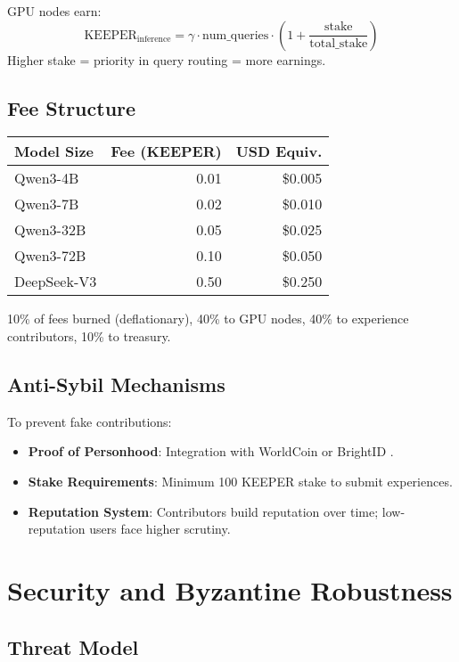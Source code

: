 \documentclass[11pt,a4paper]{article}
\begin{document}
GPU nodes earn:
\[
\text{KEEPER}_{\text{inference}} = \gamma \cdot \text{num\_queries} \cdot \left(1 + \frac{\text{stake}}{\text{total\_stake}}\right)
\]
Higher stake = priority in query routing = more earnings.

\subsection{Fee Structure}

\begin{center}
\begin{tabular}{lrr}
\toprule
\textbf{Model Size} & \textbf{Fee (KEEPER)} & \textbf{USD Equiv.} \\
\midrule
Qwen3-4B & 0.01 & \$0.005 \\
Qwen3-7B & 0.02 & \$0.010 \\
Qwen3-32B & 0.05 & \$0.025 \\
Qwen3-72B & 0.10 & \$0.050 \\
DeepSeek-V3 & 0.50 & \$0.250 \\
\bottomrule
\end{tabular}
\end{center}

10\% of fees burned (deflationary), 40\% to GPU nodes, 40\% to experience contributors, 10\% to treasury.

\subsection{Anti-Sybil Mechanisms}

To prevent fake contributions:
\begin{itemize}
\item \textbf{Proof of Personhood}: Integration with WorldCoin \cite{worldcoin2023whitepaper} or BrightID \cite{brightid2021whitepaper}.
\item \textbf{Stake Requirements}: Minimum 100 KEEPER stake to submit experiences.
\item \textbf{Reputation System}: Contributors build reputation over time; low-reputation users face higher scrutiny.
\end{itemize}

\section{Security and Byzantine Robustness}

\subsection{Threat Model}
\end{document}

